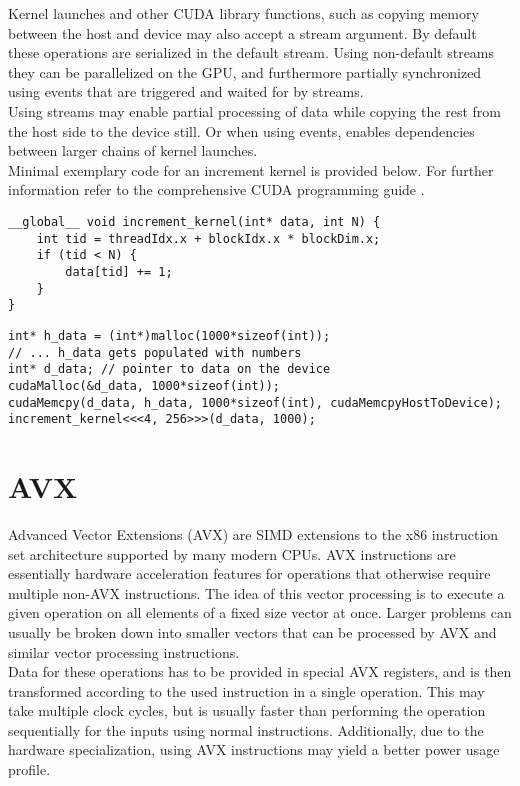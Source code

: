 \documentclass{tudscrreprt}
\begin{document}
				Kernel launches and other CUDA library functions, such as copying memory between the host and device may also accept a stream argument. By default these operations are serialized in the default stream. Using non-default streams they can be parallelized on the GPU, and furthermore partially synchronized using events that are triggered and waited for by streams. \\
				Using streams may enable partial processing of data while copying the rest from the host side to the device still. Or when using events, enables dependencies between larger chains of kernel launches. \\
				
				Minimal exemplary code for an increment kernel is provided below. For further information refer to the comprehensive CUDA programming guide \cite{cuda_programmingguide}.
				\begin{lstlisting}[caption=Device Side: Increment Kernel]
__global__ void increment_kernel(int* data, int N) {
	int tid = threadIdx.x + blockIdx.x * blockDim.x;
	if (tid < N) {
		data[tid] += 1;
	}
}
				\end{lstlisting}
				
				\begin{lstlisting}[caption=Host Side: Device Malloc and Kernel Launch]
int* h_data = (int*)malloc(1000*sizeof(int));
// ... h_data gets populated with numbers
int* d_data; // pointer to data on the device
cudaMalloc(&d_data, 1000*sizeof(int));
cudaMemcpy(d_data, h_data, 1000*sizeof(int), cudaMemcpyHostToDevice);
increment_kernel<<<4, 256>>>(d_data, 1000);
				\end{lstlisting}
				
			
		\section{AVX}
			Advanced Vector Extensions (AVX) are SIMD extensions to the x86 instruction set architecture supported by many modern CPUs. AVX instructions are essentially hardware acceleration features for operations that otherwise require multiple non-AVX instructions. The idea of this vector processing is to execute a given operation on all elements of a fixed size vector at once. Larger problems can usually be broken down into smaller vectors that can be processed by AVX and similar vector processing instructions. \\
			Data for these operations has to be provided in special AVX registers, and is then transformed according to the used instruction in a single operation. This may take multiple clock cycles, but is usually faster than performing the operation sequentially for the inputs using normal instructions. Additionally, due to the hardware specialization, using AVX instructions may yield a better power usage profile. \\
			
\end{document}
